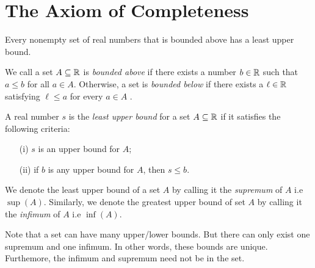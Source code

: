
% 

\chapter{The Axiom of Completeness}

\begin{tcolorbox}
    \begin{thm}
        Every nonempty set of real numbers that is bounded above has a least upper bound.
    \end{thm}
\end{tcolorbox}

\begin{tcolorbox}
    \begin{defn}
        We call a set \( A \subseteq \mathbb{R} \) is \textit{bounded above} if there exists a number \( b \in \mathbb{R} \) such that \( a \leq b \) for all \( a \in A \).
        Otherwise, a set is \textit{bounded below} if there exists a \( \ell \in \mathbb{R} \) satisfying \( \ell \leq a \) for every \( a \in A \) .
    \end{defn}

\end{tcolorbox}

\begin{tcolorbox}

    \begin{defn}
        A real number \( s \) is the \textit{least upper bound} for a set \( A \subseteq \mathbb{R} \) if it satisfies the following criteria:

        \begin{enumerate}
            \item[(i)] \( s \) is an upper bound for \( A \);
            \item[(ii)] if \( b \) is any upper bound for \( A \), then \( s \leq b \). 
        \end{enumerate}


        
    \end{defn}


\end{tcolorbox}

We denote the least upper bound of a set \( A \) by calling it the \textit{supremum} of \( A \) i.e \( \sup(A) \). Similarly, we denote the greatest upper bound of set \( A \) by calling it the \textit{infimum} of \( A \) i.e \( \inf(A) \).

Note that a set can have many upper/lower bounds. But there can only exist one supremum and one infimum. In other words, these bounds are unique. Furthemore, the infimum and supremum need not be in the set.

